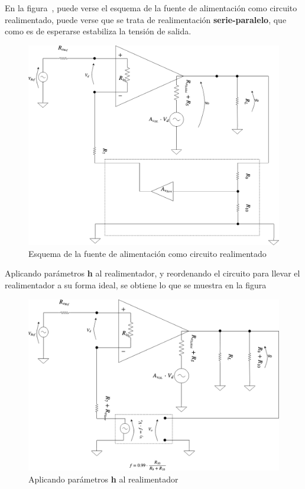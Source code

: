 \label{section:voltage_loop_justification}


En la figura~, puede verse el esquema de la fuente de alimentación como circuito realimentado, puede verse que se trata de realimentación \textbf{serie-paralelo}, que como es de esperarse estabiliza la tensión de salida.

\begin{figure}[H] %
\begin{center}
\includegraphics[width=0.9 \textwidth, angle=0]{./img/voltage_loop/VOLTAGE_LOOP_1.png}
\caption{\label{fig:fig_voltage_loop_1}\footnotesize{Esquema de la fuente de alimentación como circuito realimentado}}
\end{center}
\end{figure}

Aplicando parámetros \textbf{h} al realimentador, y reordenando el circuito para llevar el realimentador a su forma ideal, se obtiene lo que se muestra en la figura~


\begin{figure}[H] %
\begin{center}
\includegraphics[width=0.9 \textwidth, angle=0]{./img/voltage_loop/VOLTAGE_LOOP_2.png}
\caption{\label{fig:fig_voltage_loop_2}\footnotesize{Aplicando parámetros \textbf{h} al realimentador}}
\end{center}
\end{figure}

